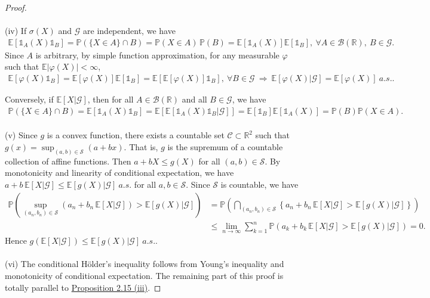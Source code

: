 \documentclass{article}
\numberwithin{equation}{section}
\newcommand{\E}{\mathbb{E}}
\renewcommand{\P}{\mathbb{P}}
\theoremstyle{plain}
\theoremstyle{definition}
\begin{document}
\begin{proof}
\paragraph{}  (iv) If $\sigma(X)$ and $\mathscr{G}$ are independent, we have
\begin{align*}
	\E[\mathds{1}_A(X)\mathds{1}_B]=\P(\{X\in A\}\cap B) = \P(X\in A)\,\P(B) = \E[\mathds{1}_A(X)]\E[\mathds{1}_B],\ \forall A\in\mathscr{B}(\mathbb{R}),\ B\in\mathscr{G}.
\end{align*}
Since $A$ is arbitrary, by simple function approximation, for any measurable $\varphi$ such that $\E\left\vert\varphi(X)\right\vert<\infty$,
\begin{align*}
	\E[\varphi(X)\mathds{1}_B] = \E[\varphi(X)]\E[\mathds{1}_B]=\E[\E[\varphi(X)]\mathds{1}_B],\ \forall B\in\mathscr{G}\ \Rightarrow\ \E[\varphi(X)|\mathscr{G}]=\E[\varphi(X)]\ a.s..
\end{align*}

Conversely, if $\E[X|\mathscr{G}]$, then for all $A\in\mathscr{B}(\mathbb{R})$ and all $B\in\mathscr{G}$, we have
\begin{align*}
	\P(\{X\in A\}\cap B)=\E[\mathds{1}_A(X)\mathds{1}_B]=\E[\E[\mathds{1}_A(X)\mathds{1}_B|\mathscr{G}]] = \E[\mathds{1}_B]\E[\mathds{1}_A(X)] = \P(B)\P(X\in A).
\end{align*}

\paragraph{} (v) Since $g$ is a convex function, there exists a countable set $\mathcal{C}\subset\mathbb{R}^2$ such that $g(x)=\sup_{(a,b)\in\mathcal{S}}(a+bx)$. That is, $g$ is the supremum of a countable collection of affine functions. Then $a+bX\leq g(X)$ for all $(a,b)\in\mathcal{S}$. By monotonicity and linearity of conditional expectation, we have $a+b\,\E[X|\mathscr{G}]\leq\E[g(X)|\mathscr{G}]\ a.s.$ for all $a,b\in\mathcal{S}$. Since $\mathcal{S}$ is countable, we have
\begin{align*}
	\P\left(\sup_{(a_n,b_n)\in\mathcal{S}}\left(a_n+b_n\,\E[X|\mathscr{G}]\right)>\E[g(X)|\mathscr{G}]\right) &= \P\left(\bigcap_{(a_n,b_n)\in\mathcal{S}}\left\{a_n+b_n\,\E[X|\mathscr{G}]>\E[g(X)|\mathscr{G}]\right\}\right)\\
	&\leq \lim_{n\to\infty}\sum_{k=1}^n\P\left(a_k+b_k\,\E[X|\mathscr{G}]>\E[g(X)|\mathscr{G}]\right) = 0.
\end{align*}
Hence $g(\E[X|\mathscr{G}])\leq \E[g(X)|\mathscr{G}]\ a.s.$.

\paragraph{} (vi) The conditional Hölder's inequality follows from Young's inequality and monotonicity of conditional expectation. The remaining part of this proof is totally parallel to \hyperref[prop:2.15]{Proposition 2.15 (iii)}.
\end{proof}
\end{document}
